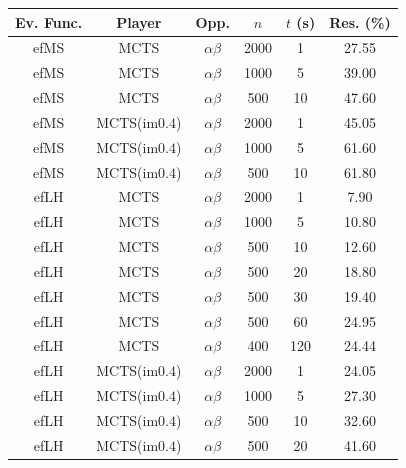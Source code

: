 \documentclass[conference]{IEEEtran}
\begin{document}

\begin{table}[t]
{\small
\begin{center}
\begin{tabular}{ccccc|c}
Ev. Func.  & Player            & Opp.             & $n$    & $t$ (s) & Res. (\%) \\
\hline
efMS       & MCTS              & $\alpha\beta$    & 2000   & 1       & 27.55     \\     
efMS       & MCTS              & $\alpha\beta$    & 1000   & 5       & 39.00     \\     
efMS       & MCTS              & $\alpha\beta$    &  500   & 10      & 47.60     \\     
\hline
efMS       & MCTS(im$0.4$)     & $\alpha\beta$    & 2000   & 1       & 45.05     \\     
efMS       & MCTS(im$0.4$)     & $\alpha\beta$    & 1000   & 5       & 61.60     \\     
efMS       & MCTS(im$0.4$)     & $\alpha\beta$    &  500   & 10      & 61.80     \\     
\hline
\hline
efLH       & MCTS              & $\alpha\beta$    & 2000   & 1       &  7.90      \\     
efLH       & MCTS              & $\alpha\beta$    & 1000   & 5       & 10.80      \\     
efLH       & MCTS              & $\alpha\beta$    &  500   & 10      & 12.60      \\     
efLH       & MCTS              & $\alpha\beta$    &  500   & 20      & 18.80      \\     
efLH       & MCTS              & $\alpha\beta$    &  500   & 30      & 19.40      \\     
efLH       & MCTS              & $\alpha\beta$    &  500   & 60      & 24.95      \\     
efLH       & MCTS              & $\alpha\beta$    &  400   & 120     & 24.44      \\     
\hline
efLH       & MCTS(im$0.4$)     & $\alpha\beta$    & 2000   & 1       & 24.05      \\     
efLH       & MCTS(im$0.4$)     & $\alpha\beta$    & 1000   & 5       & 27.30      \\     
efLH       & MCTS(im$0.4$)     & $\alpha\beta$    &  500   & 10      & 32.60      \\     
efLH       & MCTS(im$0.4$)     & $\alpha\beta$    &  500   & 20      & 41.60      \\     

\end{tabular}
\end{center}}
\end{table}
\end{document}
